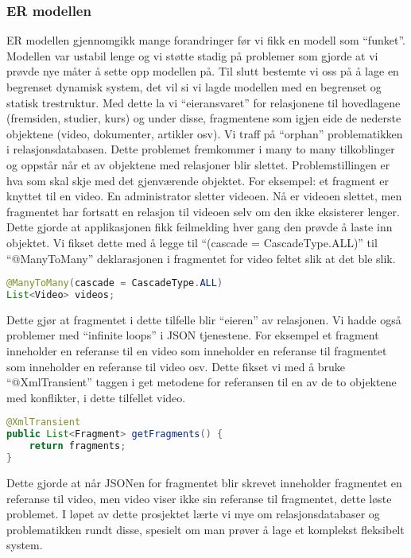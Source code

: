 \documentclass[../main.tex]{subfiles}
\begin{document}
\subsubsection{ER modellen}
ER modellen gjennomgikk mange forandringer før vi fikk en modell som “funket”. Modellen var ustabil lenge og vi støtte stadig på problemer som gjorde at vi prøvde nye måter å sette opp modellen på. Til slutt bestemte vi oss på å lage en begrenset dynamisk system, det vil si vi lagde modellen med en begrenset og statisk trestruktur. Med dette la vi “eieransvaret” for relasjonene til hovedlagene (fremsiden, studier, kurs) og under disse, fragmentene som igjen eide de nederste objektene (video, dokumenter, artikler osv). \newline
Vi traff på “orphan” problematikken i relasjonsdatabasen. Dette problemet fremkommer i many to many tilkoblinger og oppstår når et av objektene med relasjoner blir slettet. Problemstillingen er hva som skal skje med det gjenværende objektet. For eksempel: et fragment er knyttet til en video. En administrator sletter videoen. Nå er videoen slettet, men fragmentet har fortsatt en relasjon til videoen selv om den ikke eksisterer lenger. Dette gjorde at applikasjonen fikk feilmelding hver gang den prøvde å laste inn objektet. Vi fikset dette med å legge til “(cascade = CascadeType.ALL)” til “@ManyToMany” deklarasjonen i fragmentet for video feltet slik at det ble slik.

\begin{lstlisting}[language=Java, frame=single]
@ManyToMany(cascade = CascadeType.ALL)
List<Video> videos;
\end{lstlisting}
Dette gjør at fragmentet i dette tilfelle blir “eieren” av relasjonen. \newline
\newline
Vi hadde også problemer med “infinite loops” i JSON tjenestene. For eksempel et fragment inneholder en referanse til en video som inneholder en referanse til fragmentet som inneholder en referanse til video osv. Dette fikset vi med å bruke “@XmlTransient” taggen i get metodene for referansen til en av de to objektene med konflikter, i dette tilfellet video.

\begin{lstlisting}[language=Java, frame=single]
@XmlTransient
public List<Fragment> getFragments() {
    return fragments;
}
\end{lstlisting}
Dette gjorde at når JSONen for fragmentet blir skrevet inneholder fragmentet en referanse til video, men video viser ikke sin referanse til fragmentet, dette løste problemet.\newline
\newline
I løpet av dette prosjektet lærte vi mye om relasjonsdatabaser og problematikken rundt disse, spesielt om man prøver å lage et komplekst fleksibelt system.
\end{document}
